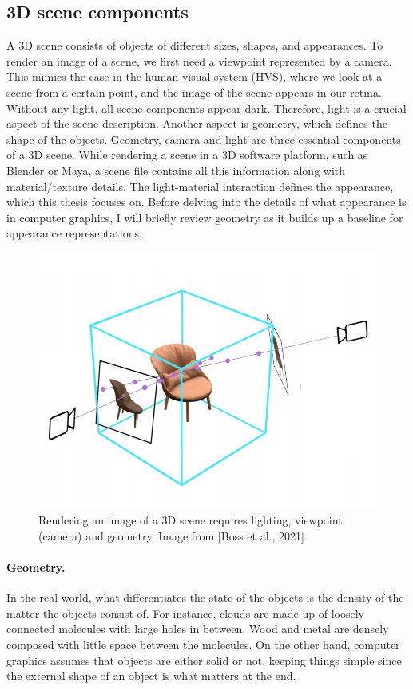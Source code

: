 \subsection{3D scene components}

A 3D scene consists of objects of different sizes, shapes, and appearances. To render an image of a scene, we first need a viewpoint represented by a camera. This mimics the case in the human visual system (\gls{HVS}), where we look at a scene from a certain point, and the image of the scene appears in our retina. Without any light, all scene components appear dark. Therefore, light is a crucial aspect of the scene description. Another aspect is geometry, which defines the shape of the objects. Geometry, camera and light are three essential components of a 3D scene. While rendering a scene in a 3D software platform, such as Blender or Maya, a scene file contains all this information along with material/texture details. The light-material interaction defines the appearance, which this thesis focuses on. Before delving into the details of what appearance is in computer graphics, I will briefly review geometry as it builds up a baseline for appearance representations.

\begin{figure}
  \centering
   \includegraphics[width=0.8\linewidth]{Images/scene_with_camera.jpg}
   \caption{Rendering an image of a 3D scene requires lighting, viewpoint (camera) and geometry. Image from [Boss et al., 2021].}
   \label{fig:teaser}
\end{figure}


\paragraph{Geometry.} In the real world, what differentiates the state of the objects is the density of the matter the objects consist of. For instance, clouds are made up of loosely connected molecules with large holes in between. Wood and metal are densely composed with little space between the molecules. On the other hand, computer graphics assumes that objects are either solid or not, keeping things simple since the external shape of an object is what matters at the end. 



